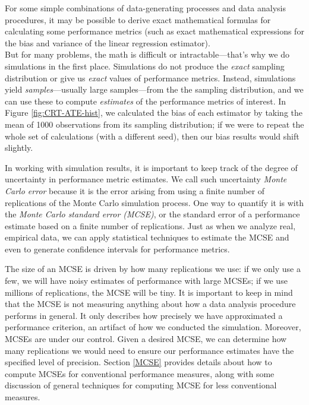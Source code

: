\documentclass[
]{book}
\begin{document}
For some simple combinations of data-generating processes and data analysis procedures, it may be possible to derive exact mathematical formulas for calculating some performance metrics (such as exact mathematical expressions for the bias and variance of the linear regression estimator).\\
But for many problems, the math is difficult or intractable---that's why we do simulations in the first place.
Simulations do not produce the \emph{exact} sampling distribution or give us \emph{exact} values of performance metrics.
Instead, simulations yield \emph{samples}---usually large samples---from the the sampling distribution, and we can use these to compute \emph{estimates} of the performance metrics of interest.
In Figure \ref{fig:CRT-ATE-hist}, we calculated the bias of each estimator by taking the mean of 1000 observations from its sampling distribution; if we were to repeat the whole set of calculations (with a different seed), then our bias results would shift slightly.

In working with simulation results, it is important to keep track of the degree of uncertainty in performance metric estimates.
We call such uncertainty \emph{Monte Carlo error} because it is the error arising from using a finite number of replications of the Monte Carlo simulation process.
One way to quantify it is with the \emph{Monte Carlo standard error (MCSE)}, or the standard error of a performance estimate based on a finite number of replications.
Just as when we analyze real, empirical data, we can apply statistical techniques to estimate the MCSE and even to generate confidence intervals for performance metrics.

The size of an MCSE is driven by how many replications we use: if we only use a few, we will have noisy estimates of performance with large MCSEs; if we use millions of replications, the MCSE will be tiny.
It is important to keep in mind that the MCSE is not measuring anything about how a data analysis procedure performs in general.
It only describes how precisely we have approximated a performance criterion, an artifact of how we conducted the simulation.
Moreover, MCSEs are under our control.
Given a desired MCSE, we can determine how many replications we would need to ensure our performance estimates have the specified level of precision.
Section \ref{MCSE} provides details about how to compute MCSEs for conventional performance measures, along with some discussion of general techniques for computing MCSE for less conventional measures.
\end{document}
